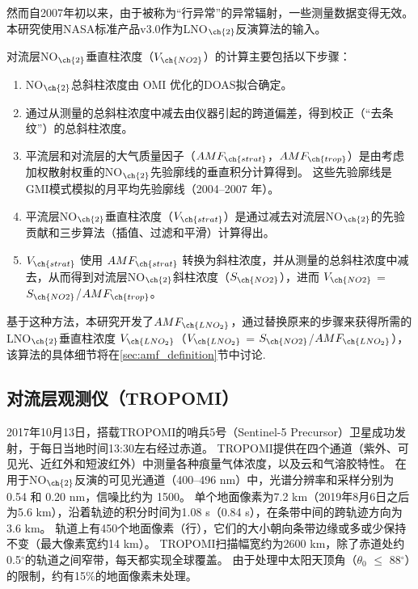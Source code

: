 然而自2007年初以来，由于被称为“行异常”的异常辐射\citep{Dobber.2008}，一些测量数据变得无效。
本研究使用NASA标准产品v3.0\citep{Krotkov.2017}作为LNO$_{\ch{2}}$反演算法的输入。

对流层NO$_{\ch{2}}$垂直柱浓度（$V_{\ch{NO2}}$）的计算主要包括以下步骤：

\begin{enumerate}[label=（\arabic*）, labelindent=\parindent, nosep, leftmargin=0pt, widest=0, itemindent=*, topsep=0pt, partopsep=0pt, parsep=0pt]

\item NO$_{\ch{2}}$总斜柱浓度由 OMI 优化的DOAS拟合确定。

\item 通过从测量的总斜柱浓度中减去由仪器引起的跨道偏差，得到校正（“去条纹”）的总斜柱浓度。

\item 平流层和对流层的大气质量因子（$AMF_{\ch{strat}}$，$AMF_{\ch{trop}}$）是由考虑加权散射权重的NO$_{\ch{2}}$先验廓线的垂直积分计算得到。
这些先验廓线是GMI模式模拟的月平均先验廓线（2004--2007 年）。

\item 平流层NO$_{\ch{2}}$垂直柱浓度（$V_{\ch{strat}}$）是通过减去对流层NO$_{\ch{2}}$的先验贡献和三步算法（插值、过滤和平滑）计算得出\citep{Bucsela.2013}。

\item $V_{\ch{strat}}$ 使用 $AMF_{\ch{strat}}$ 转换为斜柱浓度，并从测量的总斜柱浓度中减去，从而得到对流层NO$_{\ch{2}}$斜柱浓度（$S_{\ch{NO2}}$），进而 $V_{\ch{NO2}}$ = $S_{\ch{NO2}}$/$AMF_{\ch{trop}}$。

\end{enumerate}

基于这种方法，本研究开发了$AMF_{\ch{LNO_2}}$，通过替换原来的步骤来获得所需的LNO$_{\ch{2}}$垂直柱浓度 $V_{\ch{LNO_2}}$（$V_{\ch{LNO_2}}$ = $S_{\ch{NO2}}$/$AMF_{\ch{LNO_2}}$），该算法的具体细节将在\ref{sec:amf_definition}节中讨论.

\subsection{对流层观测仪（TROPOMI）}

2017年10月13日，搭载TROPOMI的哨兵5号（Sentinel-5 Precursor）卫星成功发射\citep{Veefkind.2012}，于每日当地时间13:30左右经过赤道。
TROPOMI提供在四个通道（紫外、可见光、近红外和短波红外）中测量各种痕量气体浓度，以及云和气溶胶特性。
在用于NO$_{\ch{2}}$反演的可见光通道（400–496 nm）中，光谱分辨率和采样分别为 0.54 和 0.20 nm，信噪比约为 1500。
单个地面像素为7.2 km（2019年8月6日之后为5.6 km），沿着轨迹的积分时间为1.08 s（0.84 s），在条带中间的跨轨迹方向为 3.6 km。
轨道上有450个地面像素（行），它们的大小朝向条带边缘或多或少保持不变（最大像素宽约14 km）。
TROPOMI扫描幅宽约为2600 km，除了赤道处约0.5$^{\circ}$的轨道之间窄带，每天都实现全球覆盖。
由于处理中太阳天顶角（$\theta_0$ $\leq$ 88$^{\circ}$）的限制，约有15\%的地面像素未处理。


